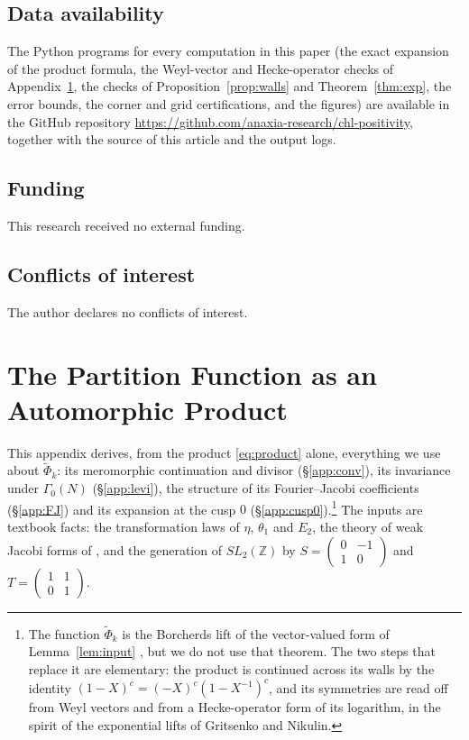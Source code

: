 \documentclass[11pt]{amsart}
\numberwithin{equation}{section}
\theoremstyle{plain}
\theoremstyle{definition}
\theoremstyle{remark}
\newcommand{\Z}{\mathbb{Z}}
\newcommand{\tPhi}{\widetilde{\Phi}}
\newcommand{\sm}[4]{\left(\begin{smallmatrix}#1&#2\\#3&#4\end{smallmatrix}\right)}
\begin{document}
\subsection*{Data availability}
The Python programs for every computation in this paper (the exact expansion of the product formula, the Weyl-vector and Hecke-operator checks of Appendix~\ref{app:sym}, the checks of Proposition~\ref{prop:walls} and Theorem~\ref{thm:exp}, the error bounds, the corner and grid certifications, and the figures) are available in the GitHub repository \url{https://github.com/anaxia-research/chl-positivity}, together with the source of this article and the output logs.

\subsection*{Funding}
This research received no external funding.

\subsection*{Conflicts of interest}
The author declares no conflicts of interest.
\appendix
\section{The Partition Function as an Automorphic Product}\label{app:sym}

This appendix derives, from the product \eqref{eq:product} alone, everything we use about $\tPhi_k$: its meromorphic continuation and divisor (\S\ref{app:conv}), its invariance under $\Gamma_0(N)$ (\S\ref{app:levi}), the structure of its Fourier--Jacobi coefficients (\S\ref{app:FJ}) and its expansion at the cusp $0$ (\S\ref{app:cusp0}).\footnote{The function $\tPhi_k$ is the Borcherds lift of the vector-valued form of Lemma~\ref{lem:input} \cite[Theorem~13.3]{Bor98}, but we do not use that theorem. The two steps that replace it are elementary: the product is continued across its walls by the identity $(1-X)^c=(-X)^c(1-X^{-1})^c$, and its symmetries are read off from Weyl vectors and from a Hecke-operator form of its logarithm, in the spirit of the exponential lifts of Gritsenko and Nikulin.} The inputs are textbook facts: the transformation laws of $\eta$, $\theta_1$ and $E_2$, the theory of weak Jacobi forms of \cite{EZ85}, and the generation of $SL_2(\Z)$ by $S=\sm0{-1}10$ and $T=\sm1101$.
\end{document}
